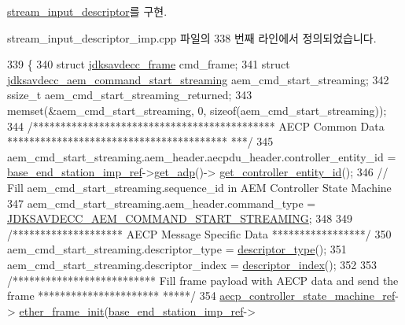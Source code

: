 \hyperlink{classavdecc__lib_1_1stream__input__descriptor_a9b919107737ba0b3d86c2c316cf3a765}{stream\+\_\+input\+\_\+descriptor}를 구현.



stream\+\_\+input\+\_\+descriptor\+\_\+imp.\+cpp 파일의 338 번째 라인에서 정의되었습니다.


\begin{DoxyCode}
339 \{
340     \textcolor{keyword}{struct }\hyperlink{structjdksavdecc__frame}{jdksavdecc\_frame} cmd\_frame;
341     \textcolor{keyword}{struct }\hyperlink{structjdksavdecc__aem__command__start__streaming}{jdksavdecc\_aem\_command\_start\_streaming} 
      aem\_cmd\_start\_streaming;
342     ssize\_t aem\_cmd\_start\_streaming\_returned;
343     memset(&aem\_cmd\_start\_streaming, 0, \textcolor{keyword}{sizeof}(aem\_cmd\_start\_streaming));
344     \textcolor{comment}{/******************************************** AECP Common Data ****************************************
      ***/}
345     aem\_cmd\_start\_streaming.aem\_header.aecpdu\_header.controller\_entity\_id = 
      \hyperlink{classavdecc__lib_1_1descriptor__base__imp_a550c969411f5f3b69f55cc139763d224}{base\_end\_station\_imp\_ref}->\hyperlink{classavdecc__lib_1_1end__station__imp_a471a74540ce6182fad0c17dfd010107e}{get\_adp}()->
      \hyperlink{classavdecc__lib_1_1adp_a0c0959a46658c0a22e9530334b2912da}{get\_controller\_entity\_id}();
346     \textcolor{comment}{// Fill aem\_cmd\_start\_streaming.sequence\_id in AEM Controller State Machine}
347     aem\_cmd\_start\_streaming.aem\_header.command\_type = 
      \hyperlink{group__command_ga02c5a086ab474b1e4d7786286811a680}{JDKSAVDECC\_AEM\_COMMAND\_START\_STREAMING};
348 
349     \textcolor{comment}{/******************** AECP Message Specific Data *****************/}
350     aem\_cmd\_start\_streaming.descriptor\_type = \hyperlink{classavdecc__lib_1_1descriptor__base__imp_aefc543029ab093823c3f5b9d84f0ccc4}{descriptor\_type}();
351     aem\_cmd\_start\_streaming.descriptor\_index = \hyperlink{classavdecc__lib_1_1descriptor__base__imp_ac23c0a35276c07cfce8c8660700c2135}{descriptor\_index}();
352 
353     \textcolor{comment}{/************************** Fill frame payload with AECP data and send the frame **********************
      *****/}
354     \hyperlink{namespaceavdecc__lib_a0b1b5aea3c0490f77cbfd9178af5be22}{aecp\_controller\_state\_machine\_ref}->
      \hyperlink{classavdecc__lib_1_1aecp__controller__state__machine_a86ff947c5e6b799cfb877d3767bfa1f9}{ether\_frame\_init}(\hyperlink{classavdecc__lib_1_1descriptor__base__imp_a550c969411f5f3b69f55cc139763d224}{base\_end\_station\_imp\_ref}->

\end{DoxyCode}

